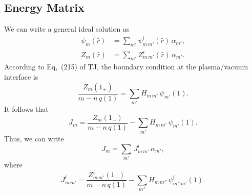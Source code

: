 \documentclass[12pt,prb,aps,notitlepage]{revtex4-1}
\begin{document}
\subsection{Energy Matrix}
We can write a general ideal solution as
\begin{align}
\psi_m(\hat{r}) &= \sum_{m'}\psi_{m\,m'}^i(\hat{r})\,\alpha_{m'},\\[0.5ex]
Z_m(\hat{r}) &= \sum_{m'}Z_{m\,m'}^i(\hat{r})\,\alpha_{m'}.
\end{align}
According to Eq,~(215) of TJ, the boundary condition at the plasma/vacuum interface is
\begin{equation}
\frac{Z_m(1_+)}{m-n\,q(1)} = \sum_{m'}H_{m\,m'}\,\psi_{m'}(1).
\end{equation}
It follows that
\begin{equation}
J_m = \frac{Z_m(1_-)}{m-n\,q(1)}-\sum_{m'} H_{m\,m'}\,\psi_{m'}(1).
\end{equation}
Thus, we can write 
\begin{equation}
J_m = \sum_{m'}\,J_{m\,m'}^i\,\alpha_{m'},
\end{equation}
where
\begin{equation}
J_{m\,m'}^i = \frac{Z_{m\,m'}^i(1_-)}{m-n\,q(1)}-\sum_{m''} H_{m\,m''}\,\psi_{m''\,m'}^i(1).
\end{equation}
\end{document}
